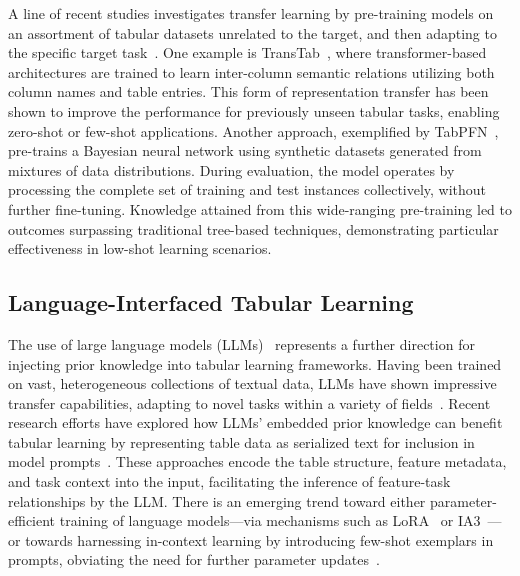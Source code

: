 A line of recent studies investigates transfer learning by pre-training models on an assortment of tabular datasets unrelated to the target, and then adapting to the specific target task~\cite{zhang2023generative,levin2022transfer,zhu2023xtab}. One example is TransTab~\cite{wang2022transtab}, where transformer-based architectures are trained to learn inter-column semantic relations utilizing both column names and table entries. This form of representation transfer has been shown to improve the performance for previously unseen tabular tasks, enabling zero-shot or few-shot applications. Another approach, exemplified by TabPFN~\cite{hollmann2022tabpfn}, pre-trains a Bayesian neural network using synthetic datasets generated from mixtures of data distributions. During evaluation, the model operates by processing the complete set of training and test instances collectively, without further fine-tuning. Knowledge attained from this wide-ranging pre-training led to outcomes surpassing traditional tree-based techniques, demonstrating particular effectiveness in low-shot learning scenarios.

\subsection{Language-Interfaced Tabular Learning} The use of large language models (LLMs)~\cite{anil2023palm,openai2023gpt4} represents a further direction for injecting prior knowledge into tabular learning frameworks. Having been trained on vast, heterogeneous collections of textual data, LLMs have shown impressive transfer capabilities, adapting to novel tasks within a variety of fields~\cite{brown2020language}. Recent research efforts have explored how LLMs' embedded prior knowledge can benefit tabular learning by representing table data as serialized text for inclusion in model prompts~\cite{dinh2022lift,hegselmann2023tabllm,wang2023anypredict}. These approaches encode the table structure, feature metadata, and task context into the input, facilitating the inference of feature-task relationships by the LLM. There is an emerging trend toward either parameter-efficient training of language models—via mechanisms such as LoRA~\cite{hu2021lora} or IA3~\cite{liu2022few}—or towards harnessing in-context learning by introducing few-shot exemplars in prompts, obviating the need for further parameter updates~\cite{dinh2022lift,hegselmann2023tabllm,nam2023semi,slack2023tablet}.

